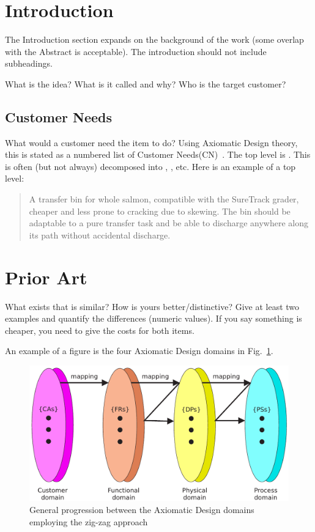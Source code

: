 \documentclass{svproc}
\begin{document}
\section{Introduction}\label{sec:introduction}
The Introduction section expands on the background of the work (some overlap with the Abstract is acceptable).
The introduction should not include subheadings.

What is the idea?  What is it called and why?
Who is the target customer?



\subsection{Customer Needs}\label{sec:customer-needs}
What would a customer need the item to do?  
Using Axiomatic Design theory, this is stated as a numbered list of Customer Needs(CN)~\cite{suh1990principles}.
The top level is .
This is often (but not always) decomposed into , , etc.
Here is an example of a top level:

\begin{quote} \textbf{} A transfer bin for whole salmon, compatible with the SureTrack grader, cheaper and less prone to cracking due to skewing.  
The bin should be adaptable to a pure transfer task and be able to discharge anywhere along its path without
accidental discharge.~\cite{gerhard2016suretrack}
\end{quote}


\section{Prior Art}\label{sec:prior-art}
What exists that is similar?  How is yours better/distinctive?
Give at least two examples and quantify the differences (numeric values).
If you say something is cheaper, you need to give the costs for both items.

An example of a figure is the four Axiomatic Design domains in Fig.~\ref{fig:ad-domains}.
\begin{figure}
  \centering
  \includegraphics[width=0.9\columnwidth]{FIG-ad-domains-zig}
  \caption{General progression between the Axiomatic Design domains employing the zig-zag approach}\label{fig:ad-domains}
\end{figure}
\end{document}
